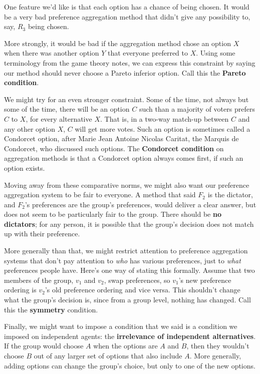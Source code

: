 One feature we'd like is that each option has a chance of being chosen. It would be a very bad preference aggregation method that didn't give any possibility to, say, $R_3$ being chosen.

More strongly, it would be bad if the aggregation method chose an option $X$ when there was another option $Y$ that everyone preferred to $X$. Using some terminology from the game theory notes, we can express this constraint by saying our method should never choose a Pareto inferior option. Call this the \textbf{Pareto condition}.

We might try for an even stronger constraint. Some of the time, not always but some of the time, there will be an option $C$ such than a majority of voters prefers $C$ to $X$, for every alternative $X$. That is, in a two-way match-up between $C$ and any other option $X$, $C$ will get more votes. Such an option is sometimes called a Condorcet option, after Marie Jean Antoine Nicolas Caritat, the Marquis de Condorcet, who discussed such options. The \textbf{Condorcet condition} on aggregation methods is that a Condorcet option always comes first, if such an option exists.

Moving away from these comparative norms, we might also want our preference aggregation system to be fair to everyone. A method that said $F_2$ is the dictator, and $F_2$'s preferences are the group's preferences, would deliver a clear answer, but does not seem to be particularly fair to the group. There should be \textbf{no dictators}; for any person, it is possible that the group's decision does not match up with their preference.

More generally than that, we might restrict attention to preference aggregation systems that don't pay attention to \textit{who} has various preferences, just to \textit{what} preferences people have. Here's one way of stating this formally. Assume that two members of the group, $v_1$ and $v_2$, swap preferences, so $v_1$'s new preference ordering is $v_2$'s old preference ordering and vice versa. This shouldn't change what the group's decision is, since from a group level, nothing has changed. Call this the \textbf{symmetry} condition.

Finally, we might want to impose a condition that we said is a condition we imposed on independent agents: the \textbf{irrelevance of independent alternatives}. If the group would choose $A$ when the options are $A$ and $B$, then they wouldn't choose $B$ out of any larger set of options that also include $A$. More generally, adding options can change the group's choice, but only to one of the new options.

